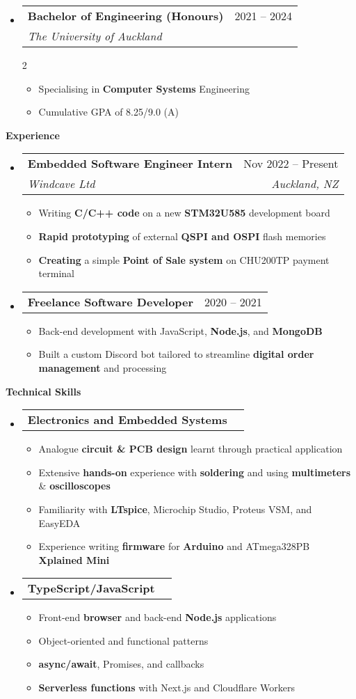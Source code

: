 \documentclass[11pt,a4paper]{article}[leftmargin=*]
\makeatletter
\def \entryspacing {-0pt}
\def \bulletstylei {\faAngleRight\hspace{-4.5pt}}
\renewcommand{\section}[2]{\vspace{5pt}
  \colorbox{secondary}{\color{white}\raggedbottom\normalsize\textbf{{#1}{\hspace{2pt}#2\hspace{4pt}}}}
}
\newcommand{\resumeEntryStart}{\begin{itemize}[leftmargin=2.5mm]}
\newcommand{\resumeEntryEnd}{\end{itemize}\vspace{\entryspacing}}
\newcommand{\resumeItemListStart}{\begin{itemize}[leftmargin=4.5mm]}
\newcommand{\resumeItemListEnd}{\end{itemize}}
\newcommand{\resumeItemListStartColumns}[2][-0.5]{\vspace*{#1\multicolsep}
\begin{multicols}{#2}\begin{itemize}[leftmargin=4.5mm]}
\newcommand{\resumeItemListEndColumns}[1][-1]{\end{itemize}\end{multicols}\vspace*{#1\multicolsep}}
\newcommand{\resumeItem}[2][\bulletstylei]{
  \item[\small#1]\small{
    {#2 \vspace{-2pt}}
  }
}
\newcommand{\resumeEntryTSDL}[4]{
  \vspace{-1pt}\item[]
    \begin{tabularx}{0.97\textwidth}{X@{\hspace{60pt}}r}
      \textbf{\color{primary}#1} & {\firabook\color{accent}\small#2} \\
      \textit{\color{accent}\small#3} & \textit{\color{accent}\small#4} \\
    \end{tabularx}\vspace{-6pt}
}
\newcommand{\resumeEntryTD}[2]{
  \vspace{-1pt}\item[]
    \begin{tabularx}{0.97\textwidth}{X@{\hspace{60pt}}r}
      \textbf{\color{primary}#1} & {\firabook\color{accent}\small#2} \\
    \end{tabularx}\vspace{-6pt}
}
\newcommand{\resumeBf}[1]{\small\textbf{\color{halfbold}#1}}
\makeatother
\begin{document}
\resumeEntryStart
\resumeEntryTSDL
{Bachelor of Engineering (Honours)}{2021 -- 2024}
{The University of Auckland}{}
\resumeItemListStartColumns[0.5]{2}
\resumeItem {Specialising in \resumeBf{Computer Systems} Engineering}
\resumeItem {Cumulative GPA of 8.25/9.0 (A)}
\resumeItemListEndColumns
\resumeEntryEnd


\section{\faBriefcase}{Experience}

\resumeEntryStart
\resumeEntryTSDL
{Embedded Software Engineer Intern}{Nov 2022 -- Present}
{Windcave Ltd}{Auckland, NZ}

\resumeItemListStart
\resumeItem {Writing \resumeBf{C/C++ code} on a new \resumeBf{STM32U585} development board}
\resumeItem {\resumeBf{Rapid prototyping} of external \resumeBf{QSPI and OSPI} flash memories}
\resumeItem {\resumeBf{Creating} a simple \resumeBf{Point of Sale system} on CHU200TP payment terminal}
\resumeItemListEnd
\resumeEntryEnd

\resumeEntryStart
\resumeEntryTD
{Freelance Software Developer}{2020 -- 2021}
\resumeItemListStart
\resumeItem {Back-end development with JavaScript, \resumeBf{Node.js}, and \resumeBf{MongoDB}}
\resumeItem {Built a custom Discord bot tailored to streamline \resumeBf{digital order management} and processing}
\resumeItemListEnd
\resumeEntryEnd


\section{\faCogs}{Technical Skills}

\resumeEntryStart
\resumeEntryTD
{Electronics and Embedded Systems}{}
\resumeItemListStart
\resumeItem {Analogue \resumeBf{circuit \& PCB design} learnt through practical application}
\resumeItem {Extensive \resumeBf{hands-on} experience with \resumeBf{soldering} and using \resumeBf{multimeters} \& \resumeBf{oscilloscopes}}
\resumeItem {Familiarity with \resumeBf{LTspice}, Microchip Studio, Proteus VSM, and EasyEDA}
\resumeItem {Experience writing \resumeBf{firmware} for \resumeBf{Arduino} and ATmega328PB \resumeBf{Xplained Mini}}
\resumeItemListEnd
\resumeEntryEnd

\resumeEntryStart
\resumeEntryTD
{TypeScript/JavaScript}{}
\resumeItemListStart
\resumeItem {Front-end \resumeBf{browser} and back-end \resumeBf{Node.js} applications}
\resumeItem {Object-oriented and functional patterns}
\resumeItem {\resumeBf{async/await}, Promises, and callbacks}
\resumeItem {\resumeBf{Serverless functions} with Next.js and Cloudflare Workers}
\resumeItemListEnd
\resumeEntryEnd
\end{document}

